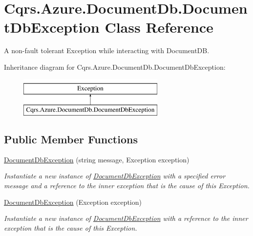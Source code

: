 \hypertarget{classCqrs_1_1Azure_1_1DocumentDb_1_1DocumentDbException}{}\section{Cqrs.\+Azure.\+Document\+Db.\+Document\+Db\+Exception Class Reference}
\label{classCqrs_1_1Azure_1_1DocumentDb_1_1DocumentDbException}


A non-\/fault tolerant Exception while interacting with Document\+DB.  


Inheritance diagram for Cqrs.\+Azure.\+Document\+Db.\+Document\+Db\+Exception\+:\begin{figure}[H]
\begin{center}
\leavevmode
\includegraphics[height=2.000000cm]{classCqrs_1_1Azure_1_1DocumentDb_1_1DocumentDbException}
\end{center}
\end{figure}
\subsection*{Public Member Functions}
\begin{DoxyCompactItemize}
\item 
\hyperlink{classCqrs_1_1Azure_1_1DocumentDb_1_1DocumentDbException_a19e08be1e69ac87230e739e784f3c6b6_a19e08be1e69ac87230e739e784f3c6b6}{Document\+Db\+Exception} (string message, Exception exception)
\begin{DoxyCompactList}\small\item\em Instantiate a new instance of \hyperlink{classCqrs_1_1Azure_1_1DocumentDb_1_1DocumentDbException}{Document\+Db\+Exception} with a specified error message and a reference to the inner {\itshape exception}  that is the cause of this Exception. \end{DoxyCompactList}\item 
\hyperlink{classCqrs_1_1Azure_1_1DocumentDb_1_1DocumentDbException_a0fe55ab6d2a689b055460557d4f50fe7_a0fe55ab6d2a689b055460557d4f50fe7}{Document\+Db\+Exception} (Exception exception)
\begin{DoxyCompactList}\small\item\em Instantiate a new instance of \hyperlink{classCqrs_1_1Azure_1_1DocumentDb_1_1DocumentDbException}{Document\+Db\+Exception} with a reference to the inner {\itshape exception}  that is the cause of this Exception. \end{DoxyCompactList}\end{DoxyCompactItemize}



